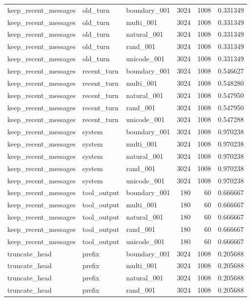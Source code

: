 \begin{tabular}{lllrrr}
keep_recent_messages & old_turn & boundary_001 & 3024 & 1008 & 0.331349 \\
keep_recent_messages & old_turn & multi_001 & 3024 & 1008 & 0.331349 \\
keep_recent_messages & old_turn & natural_001 & 3024 & 1008 & 0.331349 \\
keep_recent_messages & old_turn & rand_001 & 3024 & 1008 & 0.331349 \\
keep_recent_messages & old_turn & unicode_001 & 3024 & 1008 & 0.331349 \\
keep_recent_messages & recent_turn & boundary_001 & 3024 & 1008 & 0.546627 \\
keep_recent_messages & recent_turn & multi_001 & 3024 & 1008 & 0.548280 \\
keep_recent_messages & recent_turn & natural_001 & 3024 & 1008 & 0.547950 \\
keep_recent_messages & recent_turn & rand_001 & 3024 & 1008 & 0.547950 \\
keep_recent_messages & recent_turn & unicode_001 & 3024 & 1008 & 0.547288 \\
keep_recent_messages & system & boundary_001 & 3024 & 1008 & 0.970238 \\
keep_recent_messages & system & multi_001 & 3024 & 1008 & 0.970238 \\
keep_recent_messages & system & natural_001 & 3024 & 1008 & 0.970238 \\
keep_recent_messages & system & rand_001 & 3024 & 1008 & 0.970238 \\
keep_recent_messages & system & unicode_001 & 3024 & 1008 & 0.970238 \\
keep_recent_messages & tool_output & boundary_001 & 180 & 60 & 0.666667 \\
keep_recent_messages & tool_output & multi_001 & 180 & 60 & 0.666667 \\
keep_recent_messages & tool_output & natural_001 & 180 & 60 & 0.666667 \\
keep_recent_messages & tool_output & rand_001 & 180 & 60 & 0.666667 \\
keep_recent_messages & tool_output & unicode_001 & 180 & 60 & 0.666667 \\
truncate_head & prefix & boundary_001 & 3024 & 1008 & 0.205688 \\
truncate_head & prefix & multi_001 & 3024 & 1008 & 0.205688 \\
truncate_head & prefix & natural_001 & 3024 & 1008 & 0.205688 \\
truncate_head & prefix & rand_001 & 3024 & 1008 & 0.205688 \\

\end{tabular}

